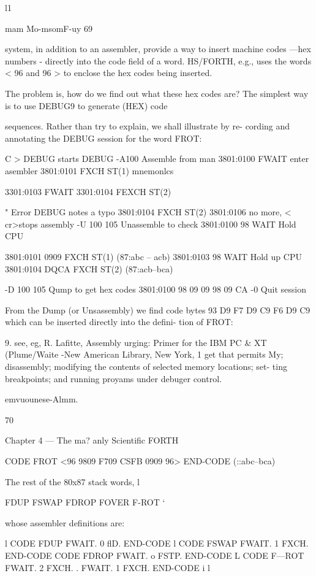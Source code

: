 {{l1

 

mam Mo-msomF-uy 69

system, in addition to an assembler, provide a way to insert
machine codes —hex numbers - directly into the code field of a
word. HS/FORTH, e.g., uses the words < 96 and 96 > to enclose
the hex codes being inserted.

The problem is, how do we find out what these hex codes are?
The simplest way is to use DEBUG9 to generate (HEX) code

sequences. Rather than try to explain, we shall illustrate by re-
cording and annotating the DEBUG session for the word FROT:

C > DEBUG starts DEBUG
-A100 Assemble from man
3801:0100 FWAIT enter asembler
3801:0101 FXCH ST(1) mnemonlcs

3301:0103 FWAIT
3301:0104 FEXCH ST(2)

" Error DEBUG notes a typo
3801:0104 FXCH ST(2)
3801:0106 no more, < cr>stops assembly
-U 100 105 Unassemble to check
3801:0100 98 WAIT Hold CPU

3801:0101 0909 FXCH ST(1)
(87:abc -- acb)
3801:0103 98 WAIT Hold up CPU
3801:0104 DQCA FXCH ST(2)
(87:acb--bca)

-D 100 105 Qump to get hex codes
3801:0100 98 09 09 98 09 CA
-0 Quit session

From the Dump (or Unsassembly) we find code bytes 93 D9 F7
D9 C9 F6 D9 C9 which can be inserted directly into the defini-
tion of FROT:

 

9. see, eg, R. Lafitte, Assembly urging: Primer for the IBM PC & XT (Plume/Waite -New
American Library, New York, 1%
get that permits My; disassembly; modifying the contents of selected memory locations; set-
ting breakpoints; and running proyams under debuger control.

emvuounese-Almm.

70

Chapter 4 — The ma? anly Scientific FORTH

CODE FROT <96 9809 F709 CSFB 0909 96>
END-CODE (::abc--bca)

The rest of the 80x87 stack words, l

FDUP FSWAP FDROP FOVER F-ROT ‘

whose assembler definitions are:

l
CODE FDUP FWAIT. 0 flD. END-CODE l
CODE FSWAP FWAIT. 1 FXCH. END-CODE
CODE FDROP FWAIT. o FSTP. END-CODE L
CODE F—ROT FWAIT. 2 FXCH. .
FWAIT. 1 FXCH. END-CODE i
l

}}
